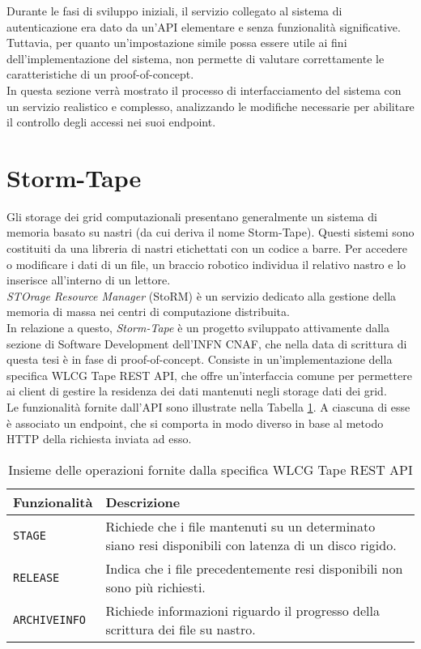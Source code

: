 Durante le fasi di sviluppo iniziali, il servizio collegato al sistema di autenticazione era dato da un'API
elementare e senza funzionalità significative.
\\ Tuttavia, per quanto un'impostazione simile possa essere utile ai fini dell'implementazione del sistema, non 
permette di valutare correttamente le caratteristiche di un proof-of-concept.
\\ In questa sezione verrà mostrato il processo di interfacciamento del sistema con un servizio 
realistico e complesso, analizzando le modifiche necessarie per abilitare il controllo degli accessi
nei suoi endpoint. 

\section{Storm-Tape}
Gli storage dei grid computazionali presentano generalmente un sistema di memoria basato su nastri (da cui deriva il nome Storm-Tape). 
Questi sistemi sono costituiti da una libreria di nastri etichettati con un codice a barre. Per accedere o modificare i dati di un file, 
un braccio robotico individua il relativo nastro e lo inserisce all'interno di un lettore.
\\ \textit{STOrage Resource Manager} (StoRM) è un servizio dedicato alla gestione della memoria 
di massa nei centri di computazione distribuita. \\ In relazione a questo, \textit{Storm-Tape} è un progetto sviluppato
 attivamente dalla sezione di Software Development dell'INFN CNAF, che nella data di scrittura di questa tesi è in fase di proof-of-concept.
Consiste in un'implementazione della specifica {WLCG Tape REST API}, che offre un'interfaccia comune per permettere 
ai client di gestire la residenza dei dati mantenuti negli storage dati dei grid. 
\\ Le funzionalità fornite dall'API sono illustrate nella Tabella \ref*{tab:table-name}. A ciascuna di esse è associato un endpoint,
 che si comporta in modo diverso in base al metodo HTTP della richiesta inviata ad esso. 

\begin{table}
\begin{center}
\begin{tabular}{ | m{7em} | m{18em} | } 
  \hline
  \textbf{Funzionalità} & \textbf{Descrizione} \\ 
  \hline
  \texttt{STAGE} & Richiede che i file mantenuti su un determinato siano resi disponibili con latenza di un disco rigido. \\ 
  \hline
  \texttt{RELEASE} & Indica che i file precedentemente resi disponibili non sono più richiesti. \\ 
  \hline
  \texttt{ARCHIVEINFO} & Richiede informazioni riguardo il progresso della scrittura dei file su nastro. \\ 
  \hline
\end{tabular}
\caption{\label{tab:table-name} Insieme delle operazioni fornite dalla specifica WLCG Tape REST API}
\end{center}
\end{table}

